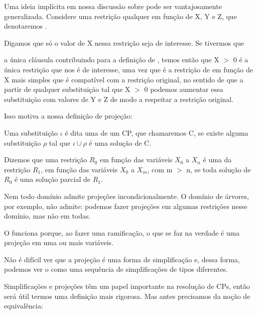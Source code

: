 \documentclass{article}
\begin{document}
Uma ideia implícita em nossa discussão sobre  pode ser vantajosamente generalizada. Considere uma restrição qualquer em função de X, Y e Z, que denotaremos .

Digamos que só o valor de X nessa restrição seja de interesse. Se tivermos que


 a única cláusula contribuindo para a definição de , temos então que X $>$ 0
é a única restrição que nos é de interesse, uma vez que é a restrição de em função de X mais simples que é compatível com a restrição original, no sentido de que a partir de qualquer substituição tal que X $>$ 0 podemos aumentar essa substituição com valores de Y e Z de modo a respeitar a restrição original.

Isso motiva a nossa definição de projeção:

\begin{definition}
  Uma substituição $\iota$ é dita uma  de um CP, que chamaremos C, se existe alguma substituição $\rho$ tal que $\iota \cup \rho$ é uma solução de C.
\end{definition}

\begin{definition}
  Dizemos que uma restrição $R_0$ em função das variáveis $X_0$ a $X_n$ é uma  da restrição $R_1$, em função das variáveis $X_0$ a $X_m$, com m $>$ n, se toda solução de $R_0$ é uma solução parcial de $R_1$.
\end{definition}

Nem todo domínio admite projeções incondicionalmente. O domínio de árvores, por exemplo, não admite: podemos fazer projeções em algumas restrições nesse domínio, mas não em todas.

O  funciona porque, ao fazer uma ramificação, o que se faz na verdade é uma projeção em uma ou mais variáveis.

Não é difícil ver que a projeção é uma forma de simplificação e, dessa forma, podemos ver o  como uma sequência de simplificações de tipos diferentes.

Simplificações e projeções têm um papel importante na resolução de CPs, então será útil termos uma definição mais rigorosa. Mas antes precisamos da noção de equivalência:
\end{document}

